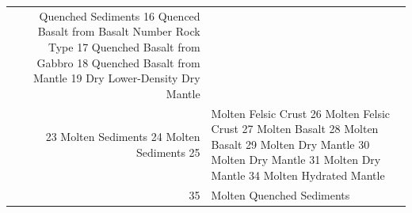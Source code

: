 \documentclass[draft,linenumbers]{agujournal2018}
\providecommand{\DIFaddtex}[1]{{\protect\color{blue} \sf #1}} %
\providecommand{\DIFdeltex}[1]{{\protect\color{red} \scriptsize #1}} %
\providecommand{\DIFaddFL}[1]{\DIFadd{#1}} %
\providecommand{\DIFdelFL}[1]{\DIFdel{#1}} %
\providecommand{\DIFaddbeginFL}{} %
\providecommand{\DIFaddendFL}{} %
\providecommand{\DIFdelbeginFL}{} %
\providecommand{\DIFdelendFL}{} %
\providecommand{\DIFadd}[1]{\texorpdfstring{\DIFaddtex{#1}}{#1}} %
\providecommand{\DIFdel}[1]{\texorpdfstring{\DIFdeltex{#1}}{}} %
\begin{document}
\begin{table}
\begin{tabular}[t]{rl}
\DIFdelFL{Quenched Sediments}%
\DIFdelFL{16 }%
\DIFdelFL{Quenced Basalt from Basalt}%
\DIFdelFL{Number }%
\DIFdelFL{Rock Type}%
\DIFdelFL{17 }%
\DIFdelFL{Quenched Basalt from Gabbro}%
\DIFdelFL{18 }%
\DIFdelFL{Quenched Basalt from Mantle}%
\DIFdelFL{19 }%
\DIFdelFL{Dry Lower-Density }\DIFdelendFL \DIFaddbeginFL \DIFaddFL{Dry }\DIFaddendFL Mantle\\
\DIFdelbeginFL \DIFdelFL{23 }%
\DIFdelFL{Molten Sediments}%
\DIFdelFL{24 }%
\DIFdelFL{Molten Sediments}%
\DIFdelendFL %
\DIFdelbeginFL \DIFdelFL{25 }\DIFdelendFL \DIFaddbeginFL \DIFaddFL{12 }\DIFaddendFL & \DIFdelbeginFL \DIFdelFL{Molten Felsic Crust}%
\DIFdelFL{26 }%
\DIFdelFL{Molten Felsic Crust}%
\DIFdelFL{27 }%
\DIFdelFL{Molten Basalt}%
\DIFdelFL{28 }%
\DIFdelFL{Molten Basalt}%
\DIFdelFL{29 }%
\DIFdelFL{Molten Dry Mantle}%
\DIFdelFL{30 }%
\DIFdelFL{Molten Dry Mantle}%
\DIFdelFL{31 }%
\DIFdelFL{Molten Dry Mantle}%
\DIFdelFL{34 }%
\DIFdelFL{Molten }\DIFdelendFL Hydrated Mantle\\
\DIFdelbeginFL \DIFdelFL{35 }\DIFdelendFL \DIFaddbeginFL \DIFaddFL{14 }\DIFaddendFL & \DIFdelbeginFL \DIFdelFL{Molten Quenched Sediments}%

\end{tabular}
\end{table}
\end{document}
